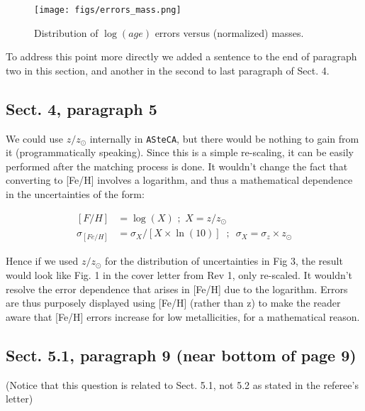 \documentclass{article}
\begin{document}
\begin{figure}[t]
    \centering
    \texttt{[image: figs/errors\_mass.png]}
    \caption{Distribution of $\log(age)$ errors versus (normalized) masses.}
    \label{fig:errors_mass}
\end{figure}

To address this point more directly we added a sentence to the end of
paragraph two in this section, and another in the second to last paragraph of
Sect. 4.


\setcounter{subsection}{12}
\subsection{Sect. 4, paragraph 5}
We could use $z/z_{\odot}$ internally in \texttt{ASteCA}, but there would be
nothing to gain from it (programmatically speaking). Since this is a simple
re-scaling, it can be easily performed after the matching process is done. It
wouldn't change the fact that converting to [Fe/H] involves a logarithm, and
thus a mathematical dependence in the uncertainties of the form:

\begin{equation}
\begin{split}
[F/H] & = \log(X) \,\,;\,\, X=z/z_{\odot} \\
\sigma_{[Fe/H]} & = \sigma_{X} / [X \times \ln(10)] \;\;;\:\;  \sigma_{X}
= \sigma_{z} \times z_{\odot}
\end{split}
\end{equation}

Hence if we used $z/z_{\odot}$ for the distribution of uncertainties in Fig 3,
the result would look like Fig. 1 in the cover letter from Rev 1, only re-scaled.
It wouldn't resolve the error dependence that arises in [Fe/H] due to the
logarithm.
%
Errors are thus purposely displayed using [Fe/H] (rather than z) to make the
reader aware that [Fe/H] errors increase for low metallicities, for a
mathematical reason.


\setcounter{subsection}{17}
\subsection{Sect. 5.1, paragraph 9 (near bottom of page 9)}
\label{sec:18}
(Notice that this question is related to Sect. 5.1, not 5.2 as stated in the
referee's letter)\\
\end{document}
